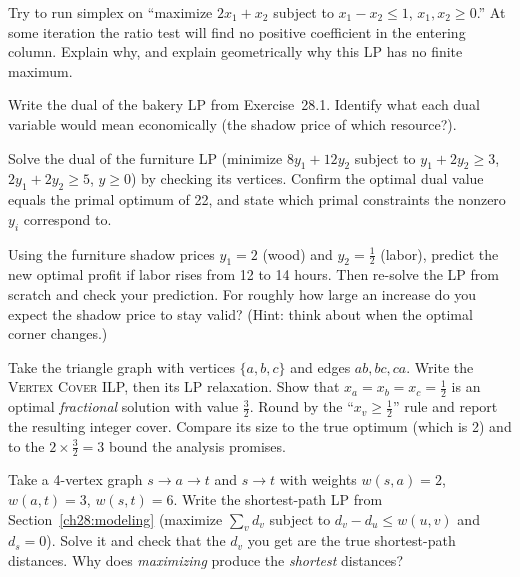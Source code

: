 \begin{exercise}
Try to run simplex on ``maximize $2x_1 + x_2$ subject to $x_1 - x_2 \le 1$,
$x_1, x_2 \ge 0$.'' At some iteration the ratio test will find no positive
coefficient in the entering column. Explain why, and explain geometrically why
this LP has no finite maximum.
\end{exercise}

\begin{exercise}
Write the dual of the bakery LP from Exercise~28.1. Identify what each dual
variable would mean economically (the shadow price of which resource?).
\end{exercise}

\begin{exercise}
Solve the dual of the furniture LP (minimize $8y_1 + 12y_2$ subject to
$y_1 + 2y_2 \ge 3$, $2y_1 + 2y_2 \ge 5$, $y \ge 0$) by checking its vertices.
Confirm the optimal dual value equals the primal optimum of 22, and state which
primal constraints the nonzero $y_i$ correspond to.
\end{exercise}

\begin{exercise}
Using the furniture shadow prices $y_1 = 2$ (wood) and $y_2 = \tfrac12$
(labor), predict the new optimal profit if labor rises from 12 to 14 hours.
Then re-solve the LP from scratch and check your prediction. For roughly how
large an increase do you expect the shadow price to stay valid? (Hint: think
about when the optimal corner changes.)
\end{exercise}

\begin{exercise}
Take the triangle graph with vertices $\{a,b,c\}$ and edges $ab, bc, ca$. Write
the \textsc{Vertex Cover} ILP, then its LP relaxation. Show that
$x_a = x_b = x_c = \tfrac12$ is an optimal \emph{fractional} solution with value
$\tfrac32$. Round by the ``$x_v \ge \tfrac12$'' rule and report the resulting
integer cover. Compare its size to the true optimum (which is 2) and to the
$2 \times \tfrac32 = 3$ bound the analysis promises.
\end{exercise}

\begin{exercise}
Take a 4-vertex graph $s \to a \to t$ and $s \to t$ with weights
$w(s,a)=2$, $w(a,t)=3$, $w(s,t)=6$. Write the shortest-path LP from
Section~\ref{ch28:modeling} (maximize $\sum_v d_v$ subject to
$d_v - d_u \le w(u,v)$ and $d_s = 0$). Solve it and check that the $d_v$ you
get are the true shortest-path distances. Why does \emph{maximizing} produce the
\emph{shortest} distances?
\end{exercise}

